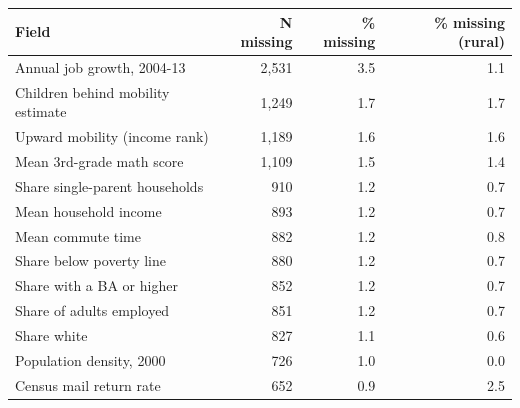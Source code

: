 \begin{tabular}{lrrr}
\toprule
Field & N missing & \% missing & \% missing (rural) \\
\midrule
Annual job growth, 2004-13 & 2,531 & 3.5 & 1.1 \\
Children behind mobility estimate & 1,249 & 1.7 & 1.7 \\
Upward mobility (income rank) & 1,189 & 1.6 & 1.6 \\
Mean 3rd-grade math score & 1,109 & 1.5 & 1.4 \\
Share single-parent households & 910 & 1.2 & 0.7 \\
Mean household income & 893 & 1.2 & 0.7 \\
Mean commute time & 882 & 1.2 & 0.8 \\
Share below poverty line & 880 & 1.2 & 0.7 \\
Share with a BA or higher & 852 & 1.2 & 0.7 \\
Share of adults employed & 851 & 1.2 & 0.7 \\
Share white & 827 & 1.1 & 0.6 \\
Population density, 2000 & 726 & 1.0 & 0.0 \\
Census mail return rate & 652 & 0.9 & 2.5 \\
\bottomrule
\end{tabular}
